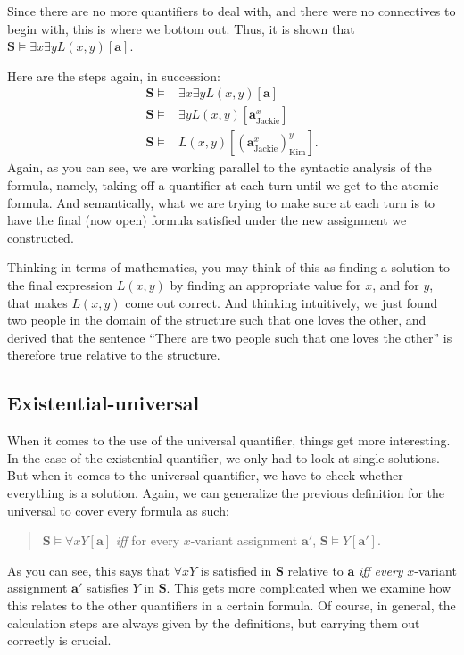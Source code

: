 Since there are no more quantifiers to deal with, and there were no connectives to begin with, this is where we bottom out. Thus, it is shown that $\mathbf{S} \models \exists x \exists y L(x, y)[\mathbf{a}]$.

Here are the steps again, in succession:
%
\begin{align*}
\mathbf{S} \models & \exists x \exists y L(x, y)[\mathbf{a}]\\
\mathbf{S} \models & \exists y L(x,y)[\mathbf{a}^x_\text{Jackie}]\\
\mathbf{S}\models & L(x, y)[(\mathbf{a}^x_\text{Jackie})^y_\text{Kim}].
\end{align*}
%
Again, as you can see, we are working parallel to the syntactic analysis of the formula, namely, taking off a quantifier at each turn until we get to the atomic formula. And semantically, what we are trying to make sure at each turn is to have the final (now open) formula satisfied under the new assignment we constructed. 

Thinking in terms of mathematics, you may think of this as finding a solution to the final expression $L(x, y)$ by finding an appropriate value for $x$, and for $y$, that makes $L(x, y)$ come out correct. And thinking intuitively, we just found two people in the domain of the structure such that one loves the other, and derived that the sentence ``There are two people such that one loves the other'' is therefore true relative to the structure. 

\subsection{Existential-universal}

When it comes to the use of the universal quantifier, things get more interesting. In the case of the existential quantifier, we only had to look at single solutions. But when it comes to the universal quantifier, we have to check whether everything is a solution. Again, we can generalize the previous definition for the universal to cover every formula as such:

\begin{quote}
	$\mathbf{S} \models \forall x Y[\mathbf{a}]$ \textit{iff} for every $x$-variant assignment $\mathbf{a}'$, $\mathbf{S} \models Y[\mathbf{a}']$. 
\end{quote}

As you can see, this says that $\forall x Y$ is satisfied in $\mathbf{S}$ relative to $\mathbf{a}$ \textit{iff} \textit{every} $x$-variant assignment $\mathbf{a}'$ satisfies $Y$ in $\mathbf{S}$. This gets more complicated when we examine how this relates to the other quantifiers in a certain formula. Of course, in general, the calculation steps are always given by the definitions, but carrying them out correctly is crucial. 

